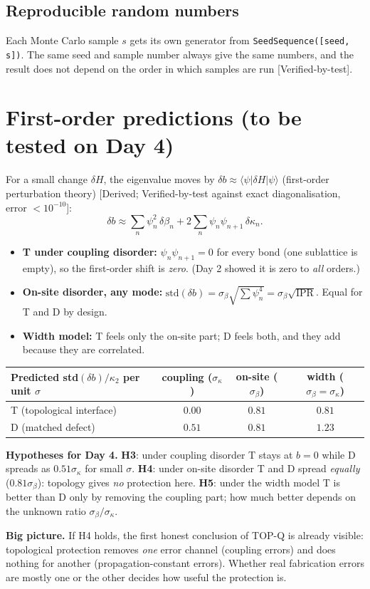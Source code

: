 \documentclass[10pt,a4paper]{article}
\newcommand{\kc}{\kappa_2}
\newcommand{\note}[1]{\par\smallskip\noindent\colorbox{gray!12}{\parbox{\dimexpr\linewidth-2\fboxsep}{\small #1}}\par\smallskip}
\newcommand{\evd}[1]{\textsf{\small[#1]}}
\begin{document}
\subsection{Reproducible random numbers}
Each Monte Carlo sample $s$ gets its own generator from \texttt{SeedSequence([seed, s])}. The same seed and sample number always give the same numbers, and the result does not depend on the order in which samples are run \evd{Verified-by-test}.

\section{First-order predictions (to be tested on Day 4)}
For a small change $\delta H$, the eigenvalue moves by $\delta b\approx\langle\psi|\delta H|\psi\rangle$ (first-order perturbation theory) \evd{Derived; Verified-by-test against exact diagonalisation, error $<10^{-10}$}:
\[
\delta b\approx\sum_n\psi_n^2\,\delta\beta_n+2\sum_n\psi_n\psi_{n+1}\,\delta\kappa_n .
\]
\begin{itemize}[itemsep=1pt]
\item \textbf{T under coupling disorder:} $\psi_n\psi_{n+1}=0$ for every bond (one sublattice is empty), so the first-order shift is \emph{zero}. (Day 2 showed it is zero to \emph{all} orders.)
\item \textbf{On-site disorder, any mode:} $\mathrm{std}(\delta b)=\sigma_\beta\sqrt{\sum\psi_n^4}=\sigma_\beta\sqrt{\mathrm{IPR}}$. Equal for T and D by design.
\item \textbf{Width model:} T feels only the on-site part; D feels both, and they add because they are correlated.
\end{itemize}

\begin{tabular}{@{}lccc@{}}\toprule
Predicted std$(\delta b)/\kc$ per unit $\sigma$ & coupling ($\sigma_\kappa$) & on-site ($\sigma_\beta$) & width ($\sigma_\beta=\sigma_\kappa$)\\\midrule
T (topological interface) & $0.00$ & $0.81$ & $0.81$\\
D (matched defect) & $0.51$ & $0.81$ & $1.23$\\\bottomrule
\end{tabular}\par\smallskip

\textbf{Hypotheses for Day 4.} \textbf{H3}: under coupling disorder T stays at $b=0$ while D spreads as $0.51\sigma_\kappa$ for small $\sigma$. \textbf{H4}: under on-site disorder T and D spread \emph{equally} ($0.81\sigma_\beta$): topology gives \emph{no} protection here. \textbf{H5}: under the width model T is better than D only by removing the coupling part; how much better depends on the unknown ratio $\sigma_\beta/\sigma_\kappa$.
\note{\textbf{Big picture.} If H4 holds, the first honest conclusion of TOP-Q is already visible: topological protection removes \emph{one} error channel (coupling errors) and does nothing for another (propagation-constant errors). Whether real fabrication errors are mostly one or the other decides how useful the protection is.}
\end{document}

